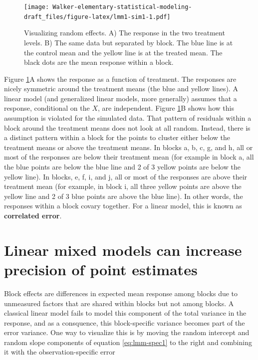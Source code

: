\documentclass[]{book}
\begin{document}
\begin{figure}
\centering
\texttt{[image: Walker-elementary-statistical-modeling-draft\_files/figure-latex/lmm1-sim1-1.pdf]}
\caption{\label{fig:lmm1-sim1}Visualizing random effects. A) The response in
the two treatment levels. B) The same data but separated by block. The
blue line is at the control mean and the yellow line is at the treated
mean. The black dots are the mean response within a block.}
\end{figure}

Figure \ref{fig:lmm1-sim1}A shows the response as a function of
treatment. The responses are nicely symmetric around the treatment means
(the blue and yellow lines). A linear model (and generalized linear
models, more generally) assumes that a response, conditional on the
\(X\), are independent. Figure \ref{fig:lmm1-sim1}B shows how this
assumption is violated for the simulated data. That pattern of residuals
within a block around the treatment means does not look at all random.
Instead, there is a distinct pattern within a block for the points to
cluster either below the treatment means or above the treatment means.
In blocks a, b, c, g, and h, all or most of the responses are below
their treatment mean (for example in block a, all the blue points are
below the blue line and 2 of 3 yellow points are below the yellow line).
In blocks, e, f, i, and j, all or most of the responses are above their
treatment mean (for example, in block i, all three yellow points are
above the yellow line and 2 of 3 blue points are above the blue line).
In other words, the responses within a block covary together. For a
linear model, this is known as \textbf{correlated error}.

\section{Linear mixed models can increase precision of point
estimates}\label{linear-mixed-models-can-increase-precision-of-point-estimates}

Block effects are differences in expected mean response among blocks due
to unmeasured factors that are shared within blocks but not among
blocks. A classical linear model fails to model this component of the
total variance in the response, and as a consquence, this block-specific
variance becomes part of the error variance. One way to visualize this
is by moving the random intercept and random slope components of
equation \eqref{eq:lmm-spec1} to the right and combining it with the
observation-specific error
\end{document}
